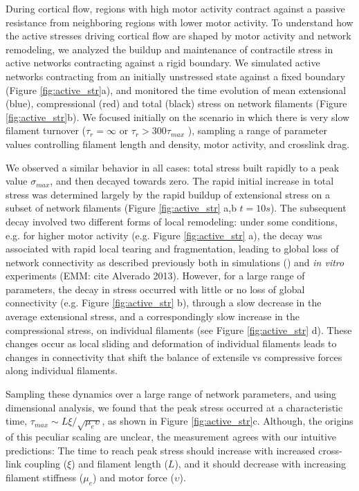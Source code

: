 \documentclass[10pt,letterpaper]{article}
\begin{document}
During cortical flow,  regions with high motor activity contract against a passive resistance from neighboring regions with lower motor activity.  To understand how the active stresses driving cortical flow are shaped by motor activity and network remodeling, we analyzed the buildup and maintenance of contractile stress in active networks contracting against a rigid boundary. We simulated active networks contracting from an initially unstressed state against a fixed boundary (Figure \ref{fig:active_str}a), and  monitored the time evolution of mean extensional (blue), compressional (red) and total (black) stress on network filaments (Figure \ref{fig:active_str}b). We focused initially on the scenario in which there is very slow filament turnover ($\tau_r = \infty$ or $\tau_r >300\tau_{max}$ ), sampling a range of parameter values controlling filament length and density, motor activity, and crosslink drag. 

We observed a similar behavior in all cases: total stress built rapidly to a peak value $\sigma_{max}$, and then decayed towards zero.  The rapid initial increase in total stress was determined largely by the rapid buildup of extensional stress on a subset of network filaments (Figure \ref{fig:active_str} a,b $t=10s$). The subsequent decay involved two different forms of local remodeling: under some conditions, e.g. for higher motor activity (e.g. Figure \ref{fig:active_str} a), the decay was associated with rapid local tearing and fragmentation, leading to global loss of network connectivity as described previously both in simulations (\cite{Mak:2016aa}) and {\em in vitro}  experiments  (EMM: cite Alverado 2013).  However, for a large range of parameters, the decay in stress occurred with little or no loss of global connectivity (e.g. Figure \ref{fig:active_str} b), through a slow decrease in the average extensional stress, and a correspondingly slow increase in the compressional stress, on individual filaments (see Figure \ref{fig:active_str} d).  These changes occur as local sliding and deformation of individual filaments leads to changes in connectivity that shift the balance of extensile vs compressive forces along individual filaments. 

Sampling these dynamics over a large range of network parameters, and using dimensional analysis, we found that the peak stress occurred at a characteristic time, $\tau_{max}\sim L\xi/\sqrt{\mu_e\upsilon}$, as shown in Figure \ref{fig:active_str}c. Although, the origins of this peculiar scaling are unclear, the measurement agrees with our intuitive predictions: The time to reach peak stress should increase with increased cross-link coupling ($\xi$) and filament length ($L$), and it should decrease with increasing filament stiffness ($\mu_e$) and motor force ($\upsilon$).  
\end{document}
